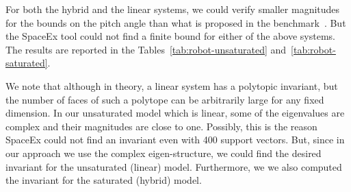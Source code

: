  For both the hybrid and the linear systems, we could
verify smaller magnitudes for the bounds on the pitch angle than what
is proposed in the benchmark~\cite{heinz2014benchmark}.  But the
SpaceEx tool could not find a finite bound for either of the above
systems.  The results are reported in the
Tables~\ref{tab:robot-unsaturated} and~\ref{tab:robot-saturated}.

  We note that although in theory, a linear system has a
polytopic invariant, but the number of faces of such a polytope can be
arbitrarily large for any fixed dimension.  In our unsaturated model
which is linear, some of the eigenvalues are complex and their
magnitudes are close to one.  Possibly, this is the reason SpaceEx
could not find an invariant even with 400 support vectors.  But, since
in our approach we use the complex eigen-structure, we could find the
desired invariant for the unsaturated (linear) model.  Furthermore, we
we also computed the invariant for the saturated (hybrid) model.

